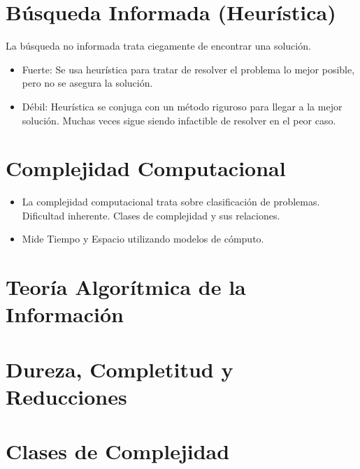 \documentclass{templateNote}
\begin{document}
\section{Búsqueda Informada (Heurística)}
La búsqueda no informada trata ciegamente de encontrar una solución.
\begin{itemize}
    \item Fuerte: Se usa heurística para tratar de resolver el problema lo mejor posible, pero no se asegura la solución.
    \item Débil: Heurística se conjuga con un método riguroso para llegar a la mejor solución. Muchas veces sigue siendo infactible de resolver en el peor caso.
\end{itemize}

\section{Complejidad Computacional}
\begin{itemize}
    \item La complejidad computacional trata sobre clasificación de problemas.
    \subitem Dificultad inherente.
    \subitem Clases de complejidad y sus relaciones.
    
    \item Mide Tiempo y Espacio utilizando modelos de cómputo.
\end{itemize}

\section{Teoría Algorítmica de la Información}

\section{Dureza, Completitud y Reducciones}

\section{Clases de Complejidad}
\end{document}
